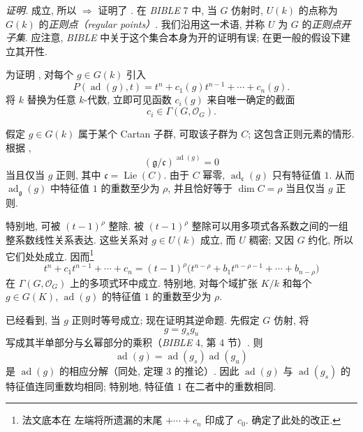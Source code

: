 \noindent\textit{证明.}
 成立, 所以  \(\Rightarrow\)  证明了 . 在 \emph{BIBLE} 7 中, 当 \(G\) 仿射时, \(U(k)\) 的点称为 \(G(k)\) 的\emph{正则点（regular points）}. 我们沿用这一术语, 并称 \(U\) 为 \(G\) 的\emph{正则点开子集}. 应注意, \emph{BIBLE} 中关于这个集合本身为开的证明有误; 在更一般的假设下建立其开性.

为证明 , 对每个 \(g\in G(k)\) 引入
\[
  P(\operatorname{ad}(g),t)
  =t^n+c_1(g)t^{n-1}+\cdots+c_n(g).
\]
将 \(k\) 替换为任意 \(k\)-代数, 立即可见函数 \(c_i(g)\) 来自唯一确定的截面
\[
  c_i\in\Gamma(G,\mathcal O_G).
\]

假定 \(g\in G(k)\) 属于某个 Cartan 子群, 可取该子群为 \(C\); 这包含正则元素的情形. 根据 ,
\[
  (\mathfrak g/\mathfrak c)^{\operatorname{ad}(g)}=0
\]
当且仅当 \(g\) 正则, 其中 \(\mathfrak c=\operatorname{Lie}(C)\). 由于 \(C\) 幂零, \(\operatorname{ad}_{\mathfrak c}(g)\) 只有特征值 \(1\). 从而 \(\operatorname{ad}_{\mathfrak g}(g)\) 中特征值 \(1\) 的重数至少为 \(\rho\), 并且恰好等于 \(\dim C=\rho\) 当且仅当 \(g\) 正则.

特别地, 可被 \((t-1)^\rho\) 整除. 被 \((t-1)^\rho\) 整除可以用多项式各系数之间的一组整系数线性关系表达. 这些关系对 \(g\in U(k)\) 成立, 而 \(U\) 稠密; 又因 \(G\) 约化, 所以它们处处成立. 因而\footnote{法文底本在  左端将所遗漏的末尾 \(+\cdots+c_n\) 印成了 \(c_0\). 确定了此处的改正.}
\[
\tag{\(\dagger\)}
  t^n+c_1t^{n-1}+\cdots+c_n
  =(t-1)^\rho
    \bigl(t^{n-\rho}+b_1t^{n-\rho-1}+\cdots+b_{n-\rho}\bigr)
\]
在 \(\Gamma(G,\mathcal O_G)\) 上的多项式环中成立. 特别地, 对每个域扩张 \(K/k\) 和每个 \(g\in G(K)\), \(\operatorname{ad}(g)\) 的特征值 \(1\) 的重数至少为 \(\rho\).

已经看到, 当 \(g\) 正则时等号成立; 现在证明其逆命题. 先假定 \(G\) 仿射, 将
\[
  g=g_sg_u
\]
写成其半单部分与幺幂部分的乘积（\emph{BIBLE} 4, 第 4 节）. 则
\[
  \operatorname{ad}(g)
  =\operatorname{ad}(g_s)\operatorname{ad}(g_u)
\]
是 \(\operatorname{ad}(g)\) 的相应分解（同处, 定理 3 的推论）. 因此 \(\operatorname{ad}(g)\) 与 \(\operatorname{ad}(g_s)\) 的特征值连同重数均相同; 特别地, 特征值 \(1\) 在二者中的重数相同.

